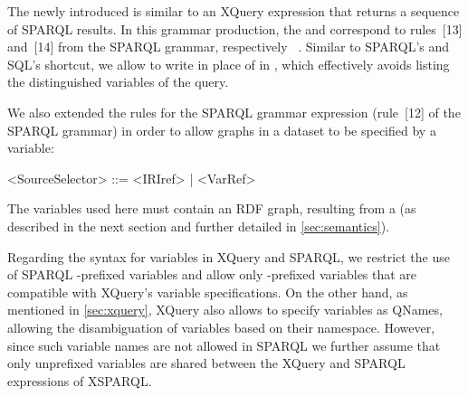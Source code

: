 \noindent The newly introduced \SparqlForClause is similar to an XQuery \FOR expression that returns a sequence of
SPARQL results.
%
In this grammar production, the \SparqlWhereClause and \SolutionModifier correspond to rules~[13] and~[14] from the
SPARQL grammar, respectively \cf~\citet[Appendix~A.8]{PrudhommeauxSeaborne:2008aa}.
%
Similar to SPARQL's and \ac{SQL}'s \lit{\SELECT *} shortcut, we allow to write \lit{\FOR *} in place of  in , which
effectively avoids listing the distinguished variables of the query.

We also extended the rules for the SPARQL  grammar expression (rule~[12] of the SPARQL grammar) in
order to allow graphs in a dataset to be specified by a variable:

{\scriptsize
  \begin{grammar}
    <SourceSelector>   ::=  <IRIref> | <VarRef>
  \end{grammar}
}


The variables used here must contain an \ac{RDF} graph, resulting from a \ConstructClause (as described in the next
section and further detailed in \cref{sec:semantics}).




Regarding the syntax for variables in XQuery and SPARQL, we restrict the use of SPARQL -prefixed variables and
allow only \lit{\var{}}-prefixed variables that are compatible with XQuery's variable specifications.
%
On the other hand, as mentioned in \cref{sec:xquery}, XQuery also allows to specify variables as QNames, allowing the
disambiguation of variables based on their namespace.  However, since such variable names are not allowed in SPARQL we
further assume that only unprefixed variables are shared between the XQuery and SPARQL expressions of XSPARQL.

